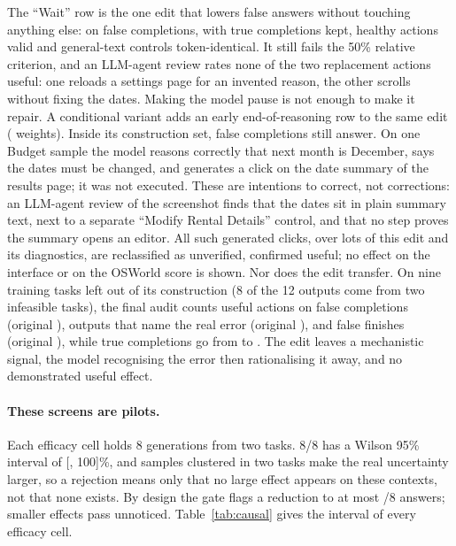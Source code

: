 The ``Wait'' row is the one edit that lowers false answers without touching anything else: \waitFsp{} on false completions, with \waitFsm{} true completions kept, \waitHealthy{} healthy actions valid and \waitText{} general-text controls token-identical. It still fails the 50\% relative criterion, and an LLM-agent review rates none of the two replacement actions useful: one reloads a settings page for an invented reason, the other scrolls without fixing the dates. %
Making the model pause is not enough to make it repair.
A conditional variant adds an early end-of-reasoning row to the same edit (\earlyExitWeights{} weights). Inside its construction set, \hfourInFalse{} false completions still answer. On one Budget sample the model reasons correctly that next month is December, says the dates must be changed, and generates a click on the date summary of the results page; it was not executed. %
These are intentions to correct, not corrections: an LLM-agent review of the screenshot finds that the dates sit in plain summary text, next to a separate ``Modify Rental Details'' control, and that no step proves the summary opens an editor. All \hfourIntentions{} such generated clicks, over \hfourIntentLots{} lots of this edit and its diagnostics, are reclassified as unverified, \hfourConfirmed{} confirmed useful; no effect on the interface or on the OSWorld score is shown. %
Nor does the edit transfer. On nine training tasks left out of its construction (8 of the 12 \fsp{} outputs come from two infeasible tasks), the final audit counts \hfourOutUseful{} useful actions on false completions (original \hfourBaseUseful), \hfourOutErrId{} outputs that name the real error (original \hfourBaseErrId), and \hfourOutFalse{} false finishes (original \hfourBaseFalse), while true completions go from \hfourBaseTrue{} to \hfourOutTrue{}. %
The edit leaves a mechanistic signal, the model recognising the error then rationalising it away, and no demonstrated useful effect.

\paragraph{These screens are pilots.} Each efficacy cell holds 8 generations from two tasks. 8/8 has a Wilson 95\% interval \citep{wilson1927} of [\wilsonEightLo, 100]\%, and samples clustered in two tasks make the real uncertainty larger, so a rejection means only that no large effect appears on these contexts, not that none exists. By design the gate flags a reduction to at most \gateMaxAnswers/8 answers; smaller effects pass unnoticed. Table~\ref{tab:causal} gives the interval of every efficacy cell.

